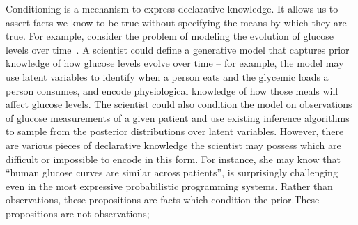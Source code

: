 


Conditioning is a mechanism to express declarative knowledge.
It allows us to assert facts we know to be true without specifying the means by which they are true.
For example, consider the problem of modeling the evolution of glucose levels over time~\citep{levine2017offline}.
A scientist could define a generative model that captures prior knowledge of how glucose levels evolve over time -- for example, the model may use latent variables to identify when a person eats and the glycemic loads a person consumes, and encode physiological knowledge of how those meals will affect glucose levels.
The scientist could also condition the model on observations of glucose measurements of a given patient and use existing inference algorithms to sample from the posterior distributions over latent variables.
However, there are various pieces of declarative knowledge the scientist may possess which are difficult or impossible to encode in this form.
For instance, she may know that ``human glucose curves are similar across patients'',   is surprisingly challenging even in the most expressive probabilistic programming systems. 
Rather than observations, these propositions are facts which condition the prior.These propositions are not observations; 

